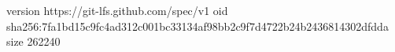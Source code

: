 version https://git-lfs.github.com/spec/v1
oid sha256:7fa1bd15c9fc4ad312c001bc33134af98bb2c9f7d4722b24b2436814302dfdda
size 262240
